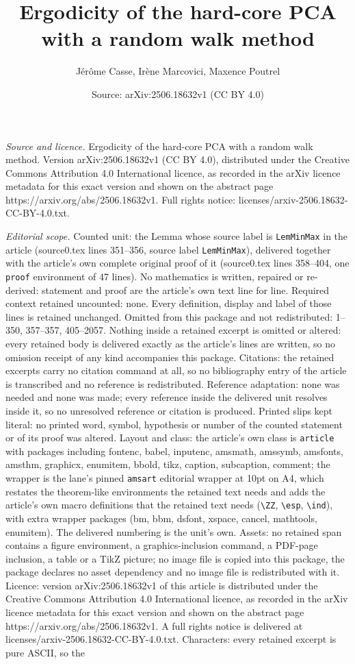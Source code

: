 \documentclass[10pt,a4paper]{amsart}
\title[Ergodicity of the hard-core PCA with a random walk method]{Ergodicity of the hard-core PCA with a random walk method}
\author{J\'er\^ome Casse, Ir\`ene Marcovici, Maxence Poutrel}
\date{Source: arXiv:2506.18632v1 (CC BY 4.0)}
\begin{document}
\maketitle

\noindent\emph{Source and licence.} Ergodicity of the hard-core PCA with a random walk method. Version arXiv:2506.18632v1 (CC BY 4.0), distributed under the Creative Commons Attribution 4.0 International licence, as recorded in the arXiv licence metadata for this exact version and shown on the abstract page https://arxiv.org/abs/2506.18632v1. Full rights notice: licenses/arxiv-2506.18632-CC-BY-4.0.txt.\par\smallskip

\noindent\textit{Editorial scope.} Counted unit: the Lemma whose source label is \texttt{LemMinMax} in the article (source0.tex lines 351--356, source label \texttt{LemMinMax}), delivered together with the article's own complete original proof of it (source0.tex lines 358--404, one \texttt{proof} environment of 47 lines). No mathematics is written, repaired or re-derived: statement and proof are the article's own text line for line. Required context retained uncounted: none. Every definition, display and label of those lines is retained unchanged. Omitted from this package and not redistributed: 1--350, 357--357, 405--2057. Nothing inside a retained excerpt is omitted or altered: every retained body is delivered exactly as the article's lines are written, so no omission receipt of any kind accompanies this package. Citations: the retained excerpts carry no citation command at all, so no bibliography entry of the article is transcribed and no reference is redistributed. Reference adaptation: none was needed and none was made; every reference inside the delivered unit resolves inside it, so no unresolved reference or citation is produced. Printed slips kept literal: no printed word, symbol, hypothesis or number of the counted statement or of its proof was altered. Layout and class: the article's own class is \texttt{article} with packages including fontenc, babel, inputenc, amsmath, amssymb, amsfonts, amsthm, graphicx, enumitem, bbold, tikz, caption, subcaption, comment; the wrapper is the lane's pinned \texttt{amsart} editorial wrapper at 10pt on A4, which restates the theorem-like environments the retained text needs and adds the article's own macro definitions that the retained text needs (\texttt{\textbackslash ZZ}, \texttt{\textbackslash esp}, \texttt{\textbackslash ind}), with extra wrapper packages (bm, bbm, dsfont, xspace, cancel, mathtools, enumitem). The delivered numbering is the unit's own. Assets: no retained span contains a figure environment, a graphics-inclusion command, a PDF-page inclusion, a table or a TikZ picture; no image file is copied into this package, the package declares no asset dependency and no image file is redistributed with it. Licence: version arXiv:2506.18632v1 of this article is distributed under the Creative Commons Attribution 4.0 International licence, as recorded in the arXiv licence metadata for this exact version and shown on the abstract page https://arxiv.org/abs/2506.18632v1. A full rights notice is delivered at licenses/arxiv-2506.18632-CC-BY-4.0.txt. Characters: every retained excerpt is pure ASCII, so the 
\end{document}
